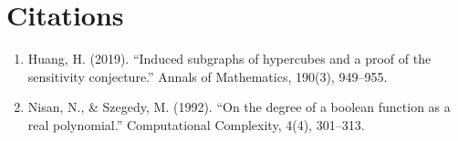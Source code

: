 \section{Citations}

\begin{enumerate}
\item Huang, H. (2019). ``Induced subgraphs of hypercubes and a proof of the sensitivity conjecture.'' Annals of Mathematics, 190(3), 949--955.
\item Nisan, N., \& Szegedy, M. (1992). ``On the degree of a boolean function as a real polynomial.'' Computational Complexity, 4(4), 301--313.
\end{enumerate}
